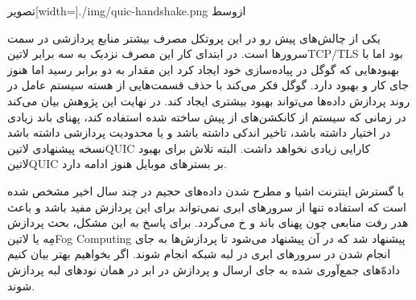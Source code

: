 ‌تصویر[width=\textwidth]{./img/quic-handshake.png}
‌ازوسط

یکی از چالش‌های پیش رو در این پروتکل مصرف بیشتر منابع پردازشی در سمت سرورها است. در ابتدای کار این مصرف نزدیک به سه برابر ‌لاتین{TCP/TLS} بود اما با بهبودهایی که گوگل در پیاده‌سازی خود ایجاد کرد
این مقدار به دو برابر رسید اما هنوز جای کار و بهبود دارد. گوگل فکر می‌کند با حذف قسمت‌هایی از هسته سیستم عامل در روند پردازش داده‌ها می‌تواند بهبود بیشتری ایجاد کند.
در نهایت این پژوهش بیان می‌کند در زمانی که سیستم از کانکشن‌های از پیش ساخته شده استفاده کند، پهنای باند زیادی در اختیار داشته باشد، تاخیر اندکی داشته باشد و یا محدودیت پردازشی داشته باشد نسخه پیشنهادی
‌لاتین{QUIC} کارایی زیادی نخواهد داشت. البته تلاش برای بهبود ‌لاتین{QUIC} بر بسترهای موبایل هنوز ادامه دارد.


با گسترش اینترنت اشیا و مطرح شدن داده‌های حجیم در چند سال اخیر مشخص شده است که استفاده تنها از سرورهای ابری نمی‌تواند برای این پردازش مفید باشد و باعث هدر رفت منابعی چون پهنای باند و ‌خ می‌گردد.
برای پاسخ به این مشکل، بحث پردازش مِه یا ‌لاتین{Fog Computing} پیشنهاد شد که در آن پیشنهاد می‌شود تا پردازش‌ها به جای انجام شدن در سرورهای ابری در لبه شبکه انجام شوند.
اگر بخواهیم بهتر بیان کنیم داده‌ّهای جمع‌آوری شده به جای ارسال و پردازش در ابر در همان نودهای لبه پردازش شوند.

